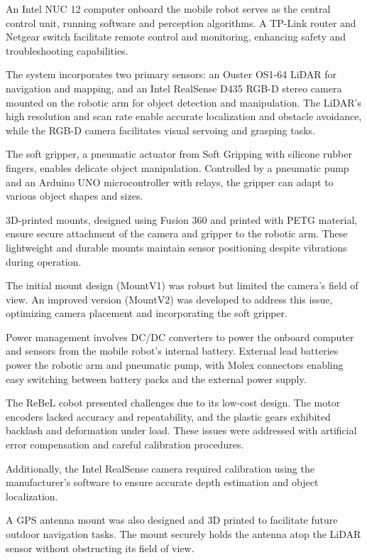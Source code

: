 An Intel NUC 12 computer onboard the mobile robot serves as the central control unit, running software and perception 
algorithms. A TP-Link router and Netgear switch facilitate remote control and monitoring, enhancing safety and
troubleshooting capabilities.

The system incorporates two primary sensors: an Ouster OS1-64 LiDAR for navigation and mapping, and an Intel 
RealSense D435 RGB-D stereo camera mounted on the robotic arm for object detection and manipulation. 
The LiDAR's high resolution and scan rate enable accurate localization and obstacle avoidance, while the RGB-D 
camera facilitates visual servoing and grasping tasks.

The soft gripper, a pneumatic actuator from Soft Gripping with silicone rubber fingers, enables delicate object
manipulation. Controlled by a pneumatic pump and an Arduino UNO microcontroller with relays, the gripper can 
adapt to various object shapes and sizes.

3D-printed mounts, designed using Fusion 360 and printed with PETG material, ensure secure attachment of the 
camera and gripper to the robotic arm. These lightweight and durable mounts maintain sensor positioning despite
vibrations during operation.

The initial mount design (MountV1) was robust but limited the camera's field of view. An improved version (MountV2)
was developed to address this issue, optimizing camera placement and incorporating the soft gripper.

Power management involves DC/DC converters to power the onboard computer and sensors from the mobile robot's 
internal battery. External lead batteries power the robotic arm and pneumatic pump, with Molex connectors enabling
easy switching between battery packs and the external power supply.

The ReBeL cobot presented challenges due to its low-cost design. The motor encoders lacked accuracy and repeatability,
and the plastic gears exhibited backlash and deformation under load. These issues were addressed with artificial 
error compensation and careful calibration procedures.

Additionally, the Intel RealSense camera required calibration using the manufacturer's software to ensure accurate
depth estimation and object localization.

A GPS antenna mount was also designed and 3D printed to facilitate future outdoor navigation tasks. The mount 
securely holds the antenna atop the LiDAR sensor without obstructing its field of view.

